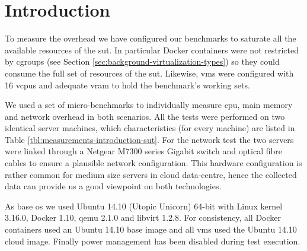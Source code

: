 %
%
\section{Introduction}
\label{sec:measurements-introduction}
To measure the overhead we have configured our benchmarks to saturate all the available resources of the
\acf{sut}. In particular Docker containers were not restricted by cgroups (see Section 
\ref{sec:background-virtualization-types}) so they could consume the full set of resources of the \ac{sut}.
Likewise, \ac{vm}s were configured with 16 v\acs{cpu}s and adequate v\acs{ram} to hold the benchmark's
working sets.

We used a set of micro-benchmarks to individually measure \acs{cpu}, main memory and network overhead in
both scenarios. All the tests were performed on two identical server machines, which characteristics
(for every machine) are listed in Table \ref{tbl:measurements-introduction-sut}. For the network test
the two servers were linked through a Netgear M7300 series Gigabit switch and optical fibre cables to ensure
a plausible network configuration. This hardware configuration is rather common for medium size servers in
cloud data-centre, hence the collected data can provide us a good viewpoint on both technologies.

As base \acs{os} we used Ubuntu 14.10 (Utopic Unicorn) 64-bit with Linux kernel 3.16.0, Docker 1.10,
\ac{qemu} 2.1.0 and libvirt 1.2.8. For consistency, all Docker containers used an Ubuntu 14.10 base
image and all \ac{vm}s used the Ubuntu 14.10 cloud image. Finally power management has been disabled
during test execution.

